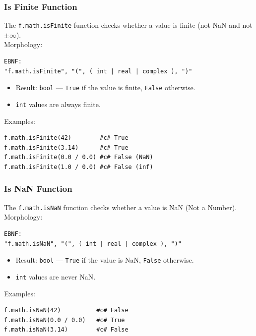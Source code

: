\subsubsection{Is Finite Function}
The \texttt{f.math.isFinite} function checks whether a value is finite (not NaN and not $\pm\infty$). \\
Morphology:
\begin{verbatim}
EBNF:
"f.math.isFinite", "(", ( int | real | complex ), ")"
\end{verbatim}
\begin{itemize}
\item Result: \texttt{bool} --- \texttt{True} if the value is finite, \texttt{False} otherwise.
\item \texttt{int} values are always finite.
\end{itemize}
Examples:
\begin{verbatim}
f.math.isFinite(42)        #c# True
f.math.isFinite(3.14)      #c# True
f.math.isFinite(0.0 / 0.0) #c# False (NaN)
f.math.isFinite(1.0 / 0.0) #c# False (inf)
\end{verbatim}

\subsubsection{Is NaN Function}
The \texttt{f.math.isNaN} function checks whether a value is NaN (Not a Number). \\
Morphology:
\begin{verbatim}
EBNF:
"f.math.isNaN", "(", ( int | real | complex ), ")"
\end{verbatim}
\begin{itemize}
\item Result: \texttt{bool} --- \texttt{True} if the value is NaN, \texttt{False} otherwise.
\item \texttt{int} values are never NaN.
\end{itemize}
Examples:
\begin{verbatim}
f.math.isNaN(42)          #c# False
f.math.isNaN(0.0 / 0.0)   #c# True
f.math.isNaN(3.14)        #c# False
\end{verbatim}

